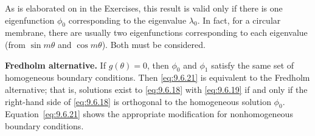 As is elaborated on in the Exercises, this result is valid only if there is one eigenfunction $\phi_0$ corresponding to the eigenvalue $\lambda_0$.  In fact, for a circular membrane, there are usually two eigenfunctions corresponding to each eigenvalue (from $\sin m\theta$ and $\cos m\theta$).  Both must be considered.

\textbf{Fredholm alternative.}
If $g(\theta) = 0$, then $\phi_0$ and $\phi_1$ satisfy the same set of homogeneous boundary conditions.  Then \eqref{eq:9.6.21} is equivalent to the Fredholm alternative; that is, solutions exist to \eqref{eq:9.6.18} with \eqref{eq:9.6.19} if and only if the right-hand side of \eqref{eq:9.6.18} is orthogonal to the homogeneous solution $\phi_0$.  Equation~\eqref{eq:9.6.21} shows the appropriate modification for nonhomogeneous boundary conditions.

